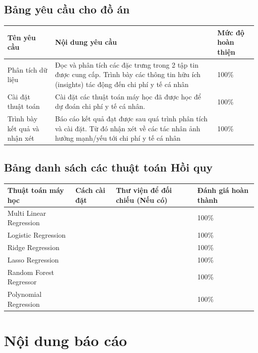 \documentclass{article}
\newcommand\T{\rule{0pt}{2.6ex}}       %
\newcommand\B{\rule[-1.2ex]{0pt}{0pt}} %
\begin{document}
	\subsection{Bảng yêu cầu cho đồ án}
	\begin{table}[H]
		\begin{tabular}{ | p{5cm} | p{6.5cm} | p{3cm} |}\hline	
			Tên yêu cầu & Nội dung yêu cầu & Mức độ hoàn thiện  \T\B\\\hline
			Phân tích dữ liệu & Đọc và phân tích các đặc trưng trong 2 tập tin được cung cấp. Trình bày các thông tin hữu ích (insights) tác động đến chi phí y tế cá nhân & 100\%  \T\B\\\hline
			Cài đặt thuật toán & Cài đặt các thuật toán máy học đã được học để dự đoán chi phí y tế cá nhân. & 100\%  \T\B\\\hline
			Trình bày kết quả và nhận xét & Báo cáo kết quả đạt được sau quá trình phân tích và cài đặt. Từ đó nhận xét về các tác nhân ảnh hưởng mạnh/yếu tới chi phí y tế cá nhân & 100\%  \T\B\\\hline
		\end{tabular}
	\end{table}	
	\subsection{Bảng danh sách các thuật toán Hồi quy}
	\begin{table}[H]
		\begin{tabular}{ | p{3cm} | p{5cm} | p{3cm} | p{3cm} |} \hline	
			Thuật toán máy học & Cách cài đặt & Thư viện để đối chiếu (Nếu có) & Đánh giá hoàn thành\T\B\\\hline
			Multi Linear Regression & & & 100\%  \T\B\\\hline
			Logistic Regression & & & 100\%  \T\B\\\hline
			Ridge Regression & & & 100\%  \T\B\\\hline
			Lasso Regression & & & 100\%  \T\B\\\hline
			Random Forest Regressor & & & 100\%  \T\B\\\hline
			Polynomial Regression & & & 100\%  \T\B\\\hline
		\end{tabular}
	\end{table}		
	\section{Nội dung báo cáo}
	
\end{document}
